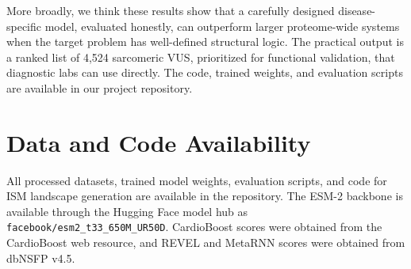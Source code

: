 \documentclass[conference]{IEEEtran}
\begin{document}
More broadly, we think these results show that a carefully designed disease-specific model, evaluated honestly, can outperform larger proteome-wide systems when the target problem has well-defined structural logic. The practical output is a ranked list of 4,524 sarcomeric VUS, prioritized for functional validation, that diagnostic labs can use directly. The code, trained weights, and evaluation scripts are available in our project repository.

\section*{Data and Code Availability}

All processed datasets, trained model weights, evaluation scripts, and code for ISM landscape generation are available in the repository. The ESM-2 backbone is available through the Hugging Face model hub as \texttt{facebook/esm2\_t33\_650M\_UR50D}. CardioBoost scores were obtained from the CardioBoost web resource, and REVEL and MetaRNN scores were obtained from dbNSFP v4.5.
\end{document}
